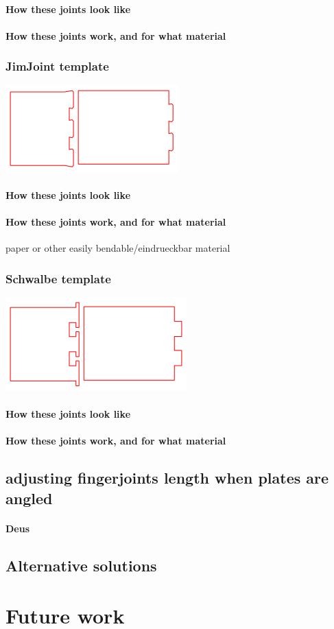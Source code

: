 \documentclass[../ClassicThesis.tex]{subfiles}
\begin{document}
\paragraph{How these joints look like}
\paragraph{How these joints work, and for what material}

\subsubsection{JimJoint template}
\includegraphics[width=0.5\columnwidth]{Images/jimjoints.png}
\paragraph{How these joints look like}
\paragraph{How these joints work, and for what material}
paper or other easily bendable/eindrueckbar material

\subsubsection{Schwalbe template}
\includegraphics[width=0.5\columnwidth]{Images/schwalbe.png}
\paragraph{How these joints look like}
\paragraph{How these joints work, and for what material}

\subsection{adjusting fingerjoints length when plates are angled}
\paragraph{Deus}

\subsection{Alternative solutions}


\section{Future work}
\end{document}
